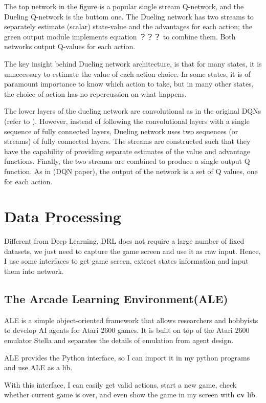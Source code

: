 \documentclass[10pt,twocolumn,letterpaper]{article}
\begin{document}
    The top network in the figure is a popular single stream Q-network, and the Dueling Q-network is the buttom one. The Dueling network has two streams to separately estimate (scalar) state-value and the advantages for each action; the green output module implements equation ？？？ to combine them. Both networks output Q-values for each action.
    
    The key insight behind Dueling network architecture, is that for many states, it is unnecessary to estimate the value of each action choice. In some states, it is of paramount importance to know which action to take, but in many other states, the choice of action has no repercussion on what happens.
    
    The lower layers of the dueling network are convolutional as in the original DQNs (refer to ). However, instead of following the convolutional layers with a single sequence of fully connected layers, Dueling network uses two sequences (or streams) of fully connected layers. The streams are constructed such that they have the capability of providing separate estimates of the value and advantage functions. Finally, the two streams are combined to produce a single output Q function. As in (DQN paper), the output of the network is a set of Q values, one for each action.
    
\section{Data Processing}
	
	Different from Deep Learning, DRL does not require a large number of fixed datasets, we just need to capture the game screen and use it as raw input. Hence, I use some interfaces to get game screen, extract states information and input them into network.
	
    \subsection{The Arcade Learning Environment(ALE)}
   	ALE is a simple object-oriented framework that allows researchers and hobbyists to develop AI agents for Atari 2600 games. It is built on top of the Atari 2600 emulator Stella and separates the details of emulation from agent design.
   	
   	ALE provides the Python interface, so I can import it in my python programs and use ALE as a lib.
   	
   	With this interface, I can easily get valid actions, start a new game, check whether current game is over, and even show the game in my screen with \textbf{cv} lib.
   	
\end{document}
